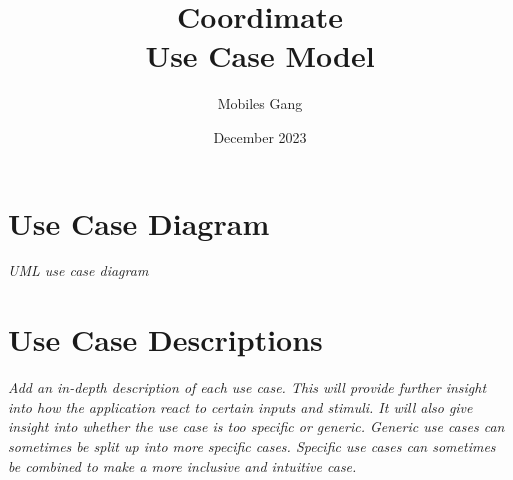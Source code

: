 \documentclass{article}
\title{Coordimate\\Use Case Model}
\date{December 2023}
\author{Mobiles Gang}
\begin{document}
\maketitle

\section{Use Case Diagram}

\textit{UML use case diagram }

\section{Use Case Descriptions}

\textit{Add an in-depth description of each use case.
This will provide further insight into how the application react to certain
inputs and stimuli. It will also give insight into whether the use case is too
specific or generic. Generic use cases can sometimes be split up into more
specific cases. Specific use cases can sometimes be combined to make a more
inclusive and intuitive case.}
\end{document}
